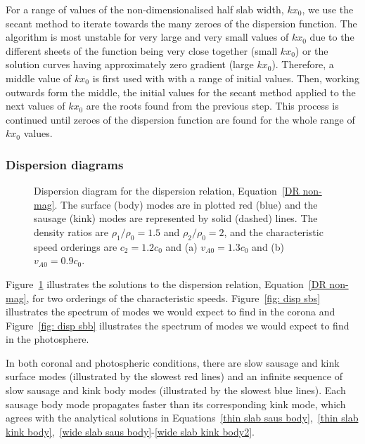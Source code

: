 For a range of values of the non-dimensionalised half slab width, $kx_0$, we use the secant method to iterate towards the many zeroes of the dispersion function. The algorithm is most unstable for very large and very small values of $kx_0$ due to the different sheets of the function being very close together (small $kx_0$) or the solution curves having approximately zero gradient (large $kx_0$). Therefore, a middle value of $kx_0$ is first used with with a range of initial values. Then, working outwards form the middle, the initial values for the secant method applied to the next values of $kx_0$ are the roots found from the previous step. This process is continued until zeroes of the dispersion function are found for the whole range of $kx_0$ values.


\subsubsection{Dispersion diagrams} \label{sec: disp diagrams}

\begin{figure}[]
	\centering
	\caption{Dispersion diagram for the dispersion relation, Equation~\eqref{DR non-mag}. The surface (body) modes are in plotted red (blue) and the sausage (kink) modes are represented by solid (dashed) lines. The density ratios are $\rho_1/\rho_0 = 1.5$ and $\rho_2/\rho_0 = 2$, and the characteristic speed orderings are $c_2 = 1.2c_0$ and (a) $v_{A0} = 1.3c_0$ and (b) $v_{A0} = 0.9c_0$.}
	\label{fig: disp}
\end{figure}

Figure~\ref{fig: disp} illustrates the solutions to the dispersion relation, Equation~\eqref{DR non-mag}, for two orderings of the characteristic speeds. Figure~\ref{fig: disp sbs} illustrates the spectrum of modes we would expect to find in the corona and Figure~\ref{fig: disp sbb} illustrates the spectrum of modes we would expect to find in the photosphere.

In both coronal and photospheric conditions, there are slow sausage and kink surface modes (illustrated by the slowest red lines) and an infinite sequence of slow sausage and kink body modes (illustrated by the slowest blue lines). Each sausage body mode propagates faster than its corresponding kink mode, which agrees with the analytical solutions in Equations~\eqref{thin slab saus body},~\eqref{thin slab kink body},~\eqref{wide slab saus body}-\eqref{wide slab kink body2}.

